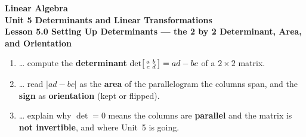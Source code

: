 \documentclass[10pt]{article}
\begin{document}
\vspace{-0.8in}

\begin{center}
  {\color{white}\textbf{\LARGE Linear Algebra}}\\[4pt]
  {\color{blushmid}\large\textbf{Unit 5 \quad Determinants and Linear Transformations}}\\[6pt]
  {\color{white}\textbf{\large Lesson 5.0 \quad Setting Up Determinants --- the 2 by 2 Determinant, Area, and Orientation}}
\end{center}

\vspace{0.22in}
\namedateperiod
\vspace{0.18in}

\begin{learningtargetbox}
\small
\begin{enumerate}[leftmargin=1.5em, itemsep=5pt]
  \item \ldots{} compute the \textbf{determinant} $\det\begin{bsmallmatrix} a & b\\ c & d \end{bsmallmatrix}=ad-bc$ of a $2\times2$ matrix.
  \item \ldots{} read $|ad-bc|$ as the \textbf{area} of the parallelogram the columns span, and the \textbf{sign} as \textbf{orientation} (kept or flipped).
  \item \ldots{} explain why $\det=0$ means the columns are \textbf{parallel} and the matrix is \textbf{not invertible}, and where Unit~5 is going.
\end{enumerate}
\end{learningtargetbox}

\vspace{0.14in}
\end{document}
